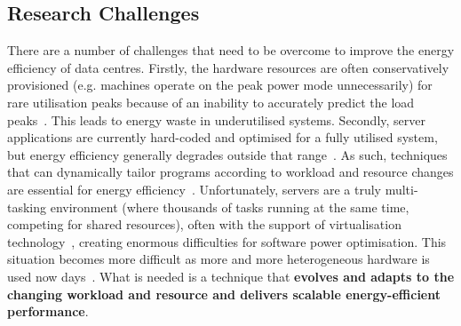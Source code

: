\subsection{Research Challenges}
There are a number of challenges that need to be overcome to improve the energy efficiency of data centres. Firstly, the hardware resources are often conservatively provisioned (e.g. machines operate on the peak power mode unnecessarily) for rare utilisation peaks because of an inability to accurately predict the load peaks~\cite{energy-aware,towardsenergyeff}. This leads to energy waste in underutilised systems. Secondly, server applications are currently hard-coded and optimised for a fully utilised system, but energy efficiency generally degrades outside that range~\cite{towardsenergyeff,autodatacentre}. As such, techniques that can dynamically tailor programs according to workload and resource changes are essential for energy efficiency~\cite{towardsenergyeff}. Unfortunately, servers are a truly multi-tasking environment (where thousands of tasks running at the same time, competing for shared resources), often with the support of virtualisation technology~\cite{energy-effcloud}, creating enormous difficulties for software power optimisation. This situation becomes more difficult as more and more heterogeneous hardware is used now days~\cite{aview}. What is needed is a technique that \textbf{evolves and adapts to the changing workload and resource and delivers scalable energy-efficient performance}.

